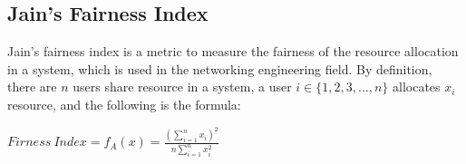 \subsection{Jain's Fairness Index}

Jain's fairness index is a metric to measure the fairness of the resource allocation in a system, which is used in the networking engineering field. By definition, there are $n$ users share resource in a system, a user $i \in \{1,2,3,...,n\}$ allocates $x_i$ resource\cite{jain_quantitative_1998}, and the following is the formula:

$Firness\ Index = f_A(x) = \frac{\left(\sum\limits_{i=1}^{n} x_i\right)^2}{n \sum\limits_{i=1}^{n} x_i^2}$

